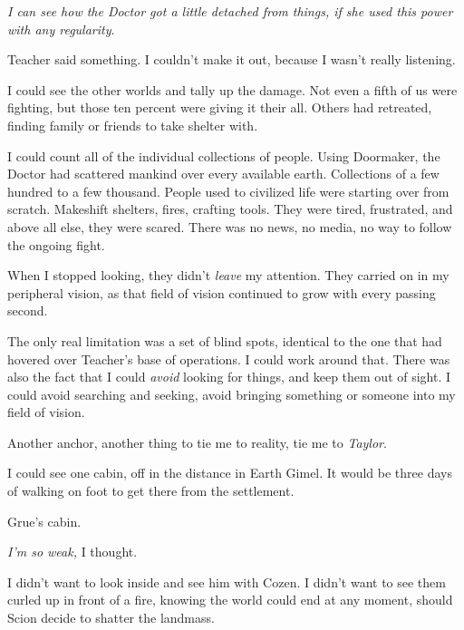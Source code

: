 \emph{I can see how the Doctor got a little detached from things, if she used this power with any regularity}.



Teacher said something.  I couldn't make it out, because I wasn't really listening.



I could see the other worlds and tally up the damage.  Not even a fifth of us were fighting, but those ten percent were giving it their all.  Others had retreated, finding family or friends to take shelter with.



I could count all of the individual collections of people.  Using Doormaker, the Doctor had scattered mankind over every available earth.  Collections of a few hundred to a few thousand.  People used to civilized life were starting over from scratch.  Makeshift shelters, fires, crafting tools.  They were tired, frustrated, and above all else, they were scared.  There was no news, no media, no way to follow the ongoing fight.



When I stopped looking, they didn't \emph{leave} my attention.  They carried on in my peripheral vision, as that field of vision continued to grow with every passing second.



The only real limitation was a set of blind spots, identical to the one that had hovered over Teacher's base of operations.  I could work around that.  There was also the fact that I could \emph{avoid }looking for things, and keep them out of sight.  I could avoid searching and seeking, avoid bringing something or someone into my field of vision.



Another anchor, another thing to tie me to reality, tie me to \emph{Taylor}.



I could see one cabin, off in the distance in Earth Gimel.  It would be three days of walking on foot to get there from the settlement.



Grue's cabin.



\emph{I'm so weak, }I thought.



I didn't want to look inside and see him with Cozen.  I didn't want to see them curled up in front of a fire, knowing the world could end at any moment, should Scion decide to shatter the landmass.



